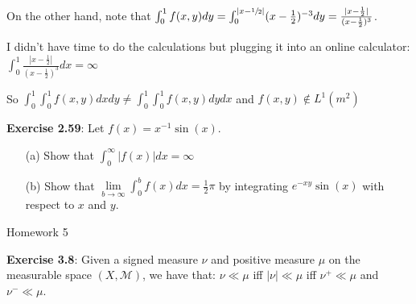 \documentclass{book}
\newcommand{\hOne}{%
   \color{Black}%
   \fontsize{14}{16}\selectfont%
}
\newenvironment{myIndent}{%
   \begin{adjustwidth}{2.5em}{0em}%
}{%
   \end{adjustwidth}%
}
\newcommand{\blab}[1]{\textbf{#1}}
\newcommand{\retTwo}{\hfill\bigbreak}
\newcommand{\mHeader}[1]{{
   \color{Black}%
   \fontsize{20}{18}\selectfont%
   #1\retTwo
}}
\begin{document}
\begin{enumerate}
\begin{myIndent}
		On the other hand, note that $\int_0^1 f(x, y)dy = \int_0^{|x - \sfrac{1}{2}|} (x - \frac{1}{2})^{-3}dy = \frac{|x-\frac{1}{2}|}{(x-\frac{1}{2})^3}$.\retTwo

		I didn't have time to do the calculations but plugging it into an online calculator: $\int_0^1 \frac{|x-\frac{1}{2}|}{(x-\frac{1}{2})^3}dx = \infty$

		So $\int_0^1\int_0^1 f(x, y)dxdy \neq \int_0^1\int_0^1 f(x, y)dydx$ and $f(x, y) \notin L^1(m^2)$

		\newpage

	\end{myIndent}

\end{enumerate}

\retTwo

\blab{Exercise 2.59}: Let $f(x) = x^{-1}\sin(x)$.

\begin{enumerate}
	\item[(a)] Show that $\int_0^\infty |f(x)|dx = \infty$
	\item[(b)] Show that $\lim\limits_{b \rightarrow \infty} \int_0^b f(x)dx = \frac{1}{2}\pi$ by integrating $e^{-xy}\sin(x)$ with respect to $x$ and $y$. 
\end{enumerate}

\newpage








{\hOne\mHeader{Homework 5}}

\blab{Exercise 3.8}: Given a signed measure $\nu$ and positive measure $\mu$ on the measurable space $(X, \mathcal{M})$, we have that: $\nu \ll \mu$ iff $|\nu| \ll \mu$ iff $\nu^+ \ll \mu$ and $\nu^- \ll \mu$.
\end{document}
